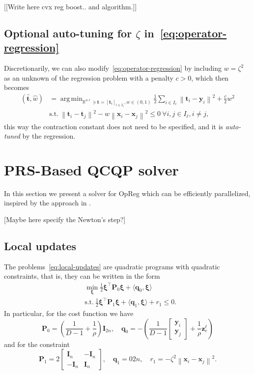 \documentclass{article}
\DeclareMathOperator*{\argmin}{arg\,min}
\newcommand{\norm}[1]{\left\lVert#1\right\rVert}
\newcommand{\R}{\mathbb{R}}
\newcommand{\q}{\mathbold{q}}
\newcommand{\tv}{\mathbold{t}}
\newcommand{\x}{\mathbold{x}}
\newcommand{\y}{\mathbold{y}}
\newcommand{\z}{\mathbold{z}}
\newcommand{\xx}{\pmb{\xi}}
\renewcommand{\Im}{\mathbold{I}}
\newcommand{\Pm}{\mathbold{P}}
\newcommand{\andrea}[1]{{\color{red}[#1]}}
\begin{document}
\andrea{[Write here cvx reg boost.. and algorithm.]}


\subsection{Optional auto-tuning for $\zeta$ in~\eqref{eq:operator-regression}}

Discretionarily, we can also modify~\eqref{eq:operator-regression} by including $w = \zeta^2$ as an unknown of the regression problem with a penalty $c>0$, which then becomes
\begin{equation}
\begin{split}
	(\hat{\tv}, \hat{w}) &= \argmin_{ \R^{n\ell} \ni \tv = [\tv_i]_{i \in I_{\ell}}, w \in (0,1)} \frac{1}{2} \sum_{i \in I_{\ell}} \norm{\tv_i - \y_i}^2 + \frac{c}{2} w^2 \\
	&\text{s.t.} \ \norm{\tv_i - \tv_j}^2 - w \norm{\x_i - \x_j}^2 \leq 0 \ \forall i,j \in I_{\ell}, i \neq j,
\end{split}
\end{equation}
this way the contraction constant does not need to be specified, and it is \emph{auto-tuned} by the regression.

\section{PRS-Based QCQP solver}
In this section we present a solver for OpReg which can be efficiently parallelized, inspired by the approach in \cite{simonetto_smooth_2021}.

[Maybe here specify the Newton's step?]

\subsection{Local updates}
The problems~\eqref{eq:local-updates} are quadratic programs with quadratic constraints, that is, they can be written in the form
\begin{subequations}
\begin{align}
	&\min_{\xx} \frac{1}{2} \xx^\top \Pm_0 \xx + \langle \q_0, \xx \rangle \\
	&\text{s.t.} \ \frac{1}{2} \xx^\top \Pm_1 \xx + \langle \q_1, \xx \rangle + r_1 \leq 0.
\end{align}
\end{subequations}
In particular, for the cost function we have
$$
	\Pm_0 = \left( \frac{1}{D-1} + \frac{1}{\rho} \right) \Im_{2n}, \quad \q_0 = - \left( \frac{1}{D-1} \begin{bmatrix} \y_i \\ \y_j \end{bmatrix} + \frac{1}{\rho} \z_e^\ell \right)
$$
and for the constraint
$$
	\Pm_1 = 2 \begin{bmatrix} \Im_n & - \Im_n \\ - \Im_n & \Im_n \end{bmatrix}, \quad \q_1 = 0{2n}, \quad r_1 = - \zeta^2 \norm{\x_i - \x_j}^2.
$$
\end{document}
